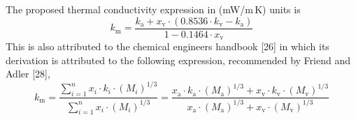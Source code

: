 \documentclass[11pt]{article}
\begin{document}
\noindent The proposed thermal conductivity expression in (mW/m\,K)
units is
\begin{equation}
k_\mathrm{m} = \frac{k_\mathrm{a}
  + x_\mathrm{v}\cdot(0.8536\cdot k_\mathrm{v}-k_\mathrm{a})}
  {1 - 0.1464\cdot x_\mathrm{v}}
\end{equation}
This is also attributed to the chemical engineers handbook [26] in
which its derivation is attributed to the following expression,
recommended by Friend and Adler [28],
\begin{equation}
k_\mathrm{m} = \frac{\sum_{i=1}^{n} x_i\cdot k_i\cdot(M_i)^{1/3}}
                    {\sum_{i=1}^{n} x_i\cdot(M_i)^{1/3}}
 = \frac{x_\mathrm{a}\cdot k_\mathrm{a}\cdot(M_\mathrm{a})^{1/3}
       + x_\mathrm{v}\cdot k_\mathrm{v}\cdot(M_\mathrm{v})^{1/3}}
       {x_\mathrm{a}\cdot(M_\mathrm{a})^{1/3}
       + x_\mathrm{v}\cdot(M_\mathrm{v})^{1/3}}
\end{equation}

\end{document}
